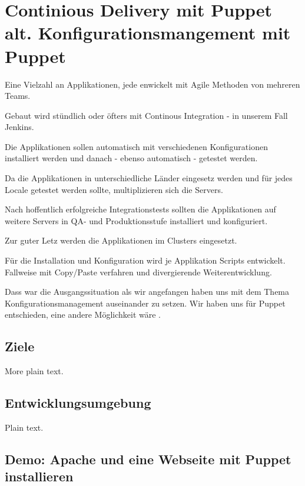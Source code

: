 \documentclass{article}
\begin{document}
\section{Continious Delivery mit Puppet alt. Konfigurationsmangement mit Puppet}

Eine Vielzahl an Applikationen, jede enwickelt mit Agile Methoden von mehreren Teams.

Gebaut wird stündlich oder öfters mit Continous Integration - in unserem Fall Jenkins\cite{Jenkins}.

Die Applikationen sollen automatisch mit verschiedenen Konfigurationen installiert werden und danach - ebenso automatisch - getestet werden.

Da die Applikationen in unterschiedliche Länder eingesetz werden und für jedes Locale getestet werden sollte, multiplizieren sich die Servers.

Nach hoffentlich erfolgreiche Integrationstests sollten die Applikationen auf weitere Servers in QA- und Produktionsstufe installiert und konfiguriert.

Zur guter Letz werden die Applikationen im Clusters eingesetzt.

Für die Installation und Konfiguration wird je Applikation Scripts entwickelt. Fallweise mit Copy/Paste verfahren und divergierende Weiterentwicklung.

Dass war die Ausgangssituation als wir angefangen haben uns mit dem Thema Konfigurationsmanagement auseinander zu setzen. Wir haben uns für 
Puppet\cite{Puppet} entschieden, eine andere Möglichkeit wäre \cite{Chef}.

\subsection{Ziele}

More plain text.

\subsection{Entwicklungsumgebung}

Plain text.

\subsection{Demo: Apache und eine Webseite mit Puppet installieren}

\author{Michael Haslgrübler}

\author{Anders Malmborg}
\end{document}
